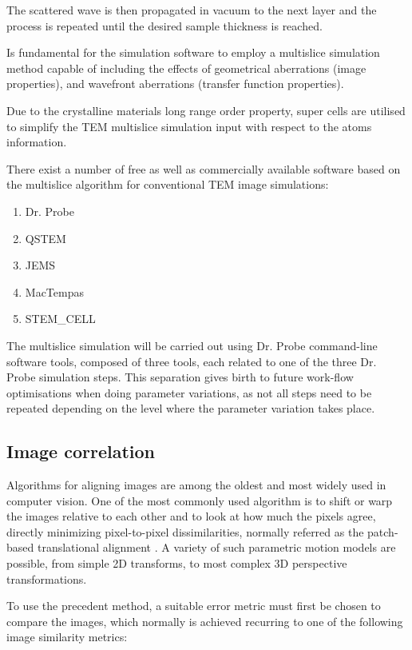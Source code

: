 \documentclass[
  oneside,
  11pt, a4paper,
  footinclude=true,
  headinclude=true,
  cleardoublepage=empty
]{scrbook}
\begin{document}
		The scattered wave is then propagated in vacuum to the next layer and the process is repeated until the desired sample thickness is reached.
		
		Is fundamental for the simulation software to employ a multislice simulation method capable of including the effects of geometrical aberrations (image properties), and 
  wavefront aberrations (transfer function properties).\par 
		
		Due to the crystalline materials long range order property, 
		super cells are utilised to  simplify the TEM multislice simulation input with respect to the atoms information.\par 
		
		There exist a number of free as well as commercially available software  based on the multislice algorithm for conventional TEM image simulations:
		\begin{enumerate}
				    \item Dr. Probe \citep{drprobe}
		    \item QSTEM \citep{koch2002determination}
		    \item JEMS \citep{stadelmann2014java}
		    \item MacTempas \citep{kilaas2014mactempasx}
		    \item STEM\_CELL \citep{stemcell}
		\end{enumerate}
		
		The multislice simulation will be carried out using Dr. Probe \citep{drprobe} %
		command-line software tools, composed of three tools, each related to one of the three Dr. Probe simulation steps.  This separation gives birth to future work-flow optimisations when doing parameter variations, as not all steps need to be repeated depending on the level where the parameter variation takes place.

		
	\subsection{Image correlation}
	
	Algorithms for aligning images are among the oldest and most widely used in computer vision.	One of the most commonly used algorithm is to shift or warp the images relative to each other and to look at how much the pixels agree, directly minimizing pixel-to-pixel dissimilarities, normally referred as  the patch-based translational alignment \citep{lucas1981iterative}. 
	A variety of such parametric motion models are possible, from simple 2D transforms, to most complex 3D perspective transformations.\par 
	To use the precedent method, a suitable error metric must first be chosen to compare the images, which normally is achieved recurring to one of the following image similarity metrics\citep{brown1992survey}:
	
\end{document}
